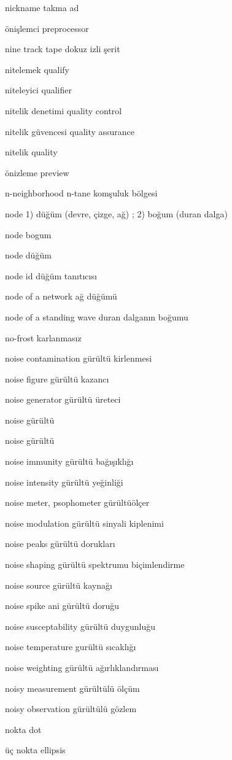 \documentclass[12pt,fleqn]{article}\usepackage{../../common}
\begin{document}
nickname takma ad

önişlemci preprocessor

nine track tape dokuz izli şerit

nitelemek qualify

niteleyici qualifier

nitelik denetimi quality control

nitelik güvencesi quality assurance

nitelik quality

önizleme preview

n-neighborhood n-tane komşuluk bölgesi

node 1) düğüm (devre, çizge, ağ) ; 2) boğum (duran dalga)

node bogum

node düğüm

node id düğüm tanıtıcısı

node of a network ağ düğümü

node of a standing wave duran dalganın boğumu

no-frost karlanmasız

noise contamination gürültü kirlenmesi

noise figure gürültü kazancı

noise generator gürültü üreteci

noise gürültü

noise gürültü

noise immunity gürültü bağışıklığı

noise intensity gürültü yeğinliği

noise meter, psophometer gürültüölçer

noise modulation gürültü sinyali kiplenimi

noise peaks gürültü dorukları

noise shaping gürültü spektrumu biçimlendirme

noise source gürültü kaynağı

noise spike ani gürültü doruğu

noise susceptability gürültü duygunluğu

noise temperature gurültü sıcaklığı

noise weighting gürültü ağırlıklandırması

noisy measurement gürültülü ölçüm

noisy observation gürültülü gözlem

nokta dot

üç nokta ellipsis
\end{document}
